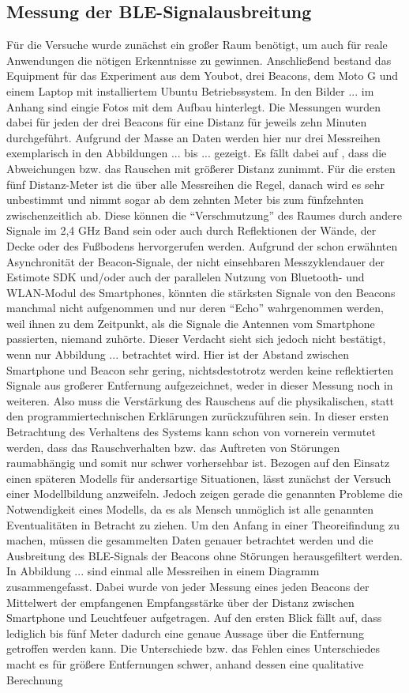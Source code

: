 \subsection{Messung der BLE-Signalausbreitung}
Für die Versuche wurde zunächst ein großer Raum benötigt, um auch für reale Anwendungen die nötigen Erkenntnisse zu gewinnen. Anschließend bestand das Equipment für das Experiment aus dem Youbot, drei Beacons, dem Moto G und einem Laptop mit installiertem Ubuntu Betriebssystem. In den Bilder ... im Anhang sind eingie Fotos mit dem Aufbau hinterlegt. Die Messungen wurden dabei für jeden der drei Beacons für eine Distanz für jeweils zehn Minuten durchgeführt. Aufgrund der Masse an Daten werden hier nur drei Messreihen exemplarisch in den Abbildungen ... bis ... gezeigt. Es fällt dabei auf , dass die Abweichungen bzw. das Rauschen mit größerer Distanz zunimmt. Für die ersten fünf Distanz-Meter ist die über alle Messreihen die Regel, danach wird es sehr unbestimmt und nimmt sogar ab dem zehnten Meter bis zum fünfzehnten zwischenzeitlich ab. Diese können die "`Verschmutzung"' des Raumes durch andere Signale im 2,4 GHz Band sein oder auch durch Reflektionen der Wände, der Decke oder des Fußbodens hervorgerufen werden. Aufgrund der schon erwähnten Asynchronität der Beacon-Signale, der nicht einsehbaren Messzyklendauer der Estimote SDK und/oder auch der parallelen Nutzung von Bluetooth- und WLAN-Modul des Smartphones, könnten die stärksten Signale von den Beacons manchmal nicht aufgenommen und nur deren "`Echo"' wahrgenommen werden, weil ihnen zu dem Zeitpunkt, als die Signale die Antennen vom Smartphone passierten, niemand zuhörte. Dieser Verdacht sieht sich jedoch nicht bestätigt, wenn nur Abbildung ... betrachtet wird. Hier ist der Abstand zwischen Smartphone und Beacon sehr gering, nichtsdestotrotz werden keine reflektierten Signale aus großerer Entfernung aufgezeichnet, weder in dieser Messung noch in weiteren. Also muss die Verstärkung des Rauschens auf die physikalischen, statt den programmiertechnischen Erklärungen zurückzuführen sein. In dieser ersten Betrachtung des Verhaltens des Systems kann schon von vornerein vermutet werden, dass das Rauschverhalten bzw. das Auftreten von Störungen raumabhängig und somit nur schwer vorhersehbar ist. Bezogen auf den Einsatz einen späteren Modells für andersartige Situationen, lässt zunächst der Versuch einer Modellbildung anzweifeln. Jedoch zeigen gerade die genannten Probleme die Notwendigkeit eines Modells, da es als Mensch unmöglich ist alle genannten Eventualitäten in Betracht zu ziehen. Um den Anfang in einer Theoreifindung zu machen, müssen die gesammelten Daten genauer betrachtet werden und die Ausbreitung des BLE-Signals der Beacons ohne Störungen herausgefiltert werden. In Abbildung ... sind einmal alle Messreihen in einem Diagramm zusammengefasst. Dabei wurde von jeder Messung eines jeden Beacons der Mittelwert der empfangenen Empfangsstärke über der Distanz zwischen Smartphone und Leuchtfeuer aufgetragen. Auf den ersten Blick  fällt auf, dass lediglich bis fünf Meter dadurch eine genaue Aussage über die Entfernung getroffen werden kann. Die Unterschiede bzw. das Fehlen eines Unterschiedes macht es für größere Entfernungen schwer, anhand dessen eine qualitative Berechnung 